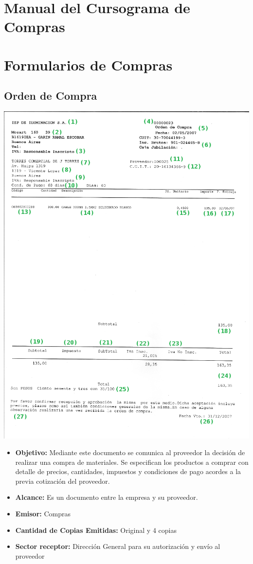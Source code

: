 \pagebreak
\section{Manual del Cursograma de Compras}


\pagebreak
\section{Formularios de Compras}
\subsection{Orden de Compra}
\begin{center}
 \includegraphics[scale=0.85,keepaspectratio=true]{./Images/FormulariosIEP/Orden-de-Compra.png}
\end{center}
\begin{itemize}
  \item \textbf{Objetivo:} Mediante este documento se comunica al proveedor la decisión de realizar una compra de materiales. Se especifican los productos a comprar con detalle de precios, cantidades, impuestos y condiciones de pago acordes a la previa cotización del proveedor.
  \item \textbf{Alcance:} Es un documento entre la empresa y su proveedor.
  \item \textbf{Emisor:} Compras
  \item \textbf{Cantidad de Copias Emitidas:} Original y 4 copias
  \item \textbf{Sector receptor:} Dirección General para su autorización y envío al proveedor
 \end{itemize}
